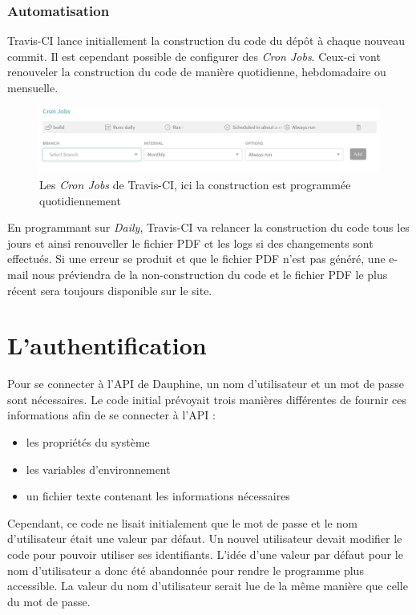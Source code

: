 \subsubsection*{Automatisation}
Travis-CI lance initiallement la construction du code du dépôt à chaque nouveau commit. Il est cependant possible de configurer des \textit{Cron Jobs}. Ceux-ci vont renouveler la construction du code de manière quotidienne, hebdomadaire ou mensuelle. 

\begin{figure}[!ht]
    \begin{center}\includegraphics[width=\textwidth]{assets/CronJobs.PNG}
    \end{center}
    \caption{Les \textit{Cron Jobs} de Travis-CI, ici la construction est programmée quotidiennement}
\end{figure}

En programmant sur \textit{Daily}, Travis-CI va relancer la construction du code tous les jours et ainsi renouveller le fichier PDF et les logs si des changements sont effectués. Si une erreur se produit et que le fichier PDF n'est pas généré, une e-mail nous préviendra de la non-construction du code et le fichier PDF le plus récent sera toujours disponible sur le site.

\section{L'authentification}

Pour se connecter à l'API de Dauphine, un nom d'utilisateur et un mot de passe sont nécessaires. Le code initial prévoyait trois manières différentes de fournir ces informations afin de se connecter à l'API :
\begin{itemize}
    \item les propriétés du système
    \item les variables d'environnement
    \item un fichier texte contenant les informations nécessaires
\end{itemize}

Cependant, ce code ne lisait initialement que le mot de passe et le nom d'utilisateur était une valeur par défaut. Un nouvel utilisateur devait modifier le code pour pouvoir utiliser ses identifiants. L'idée d'une valeur par défaut pour le nom d'utilisateur a donc été abandonnée pour rendre le programme plus accessible. La valeur du nom d'utilisateur serait lue de la même manière que celle du mot de passe.

